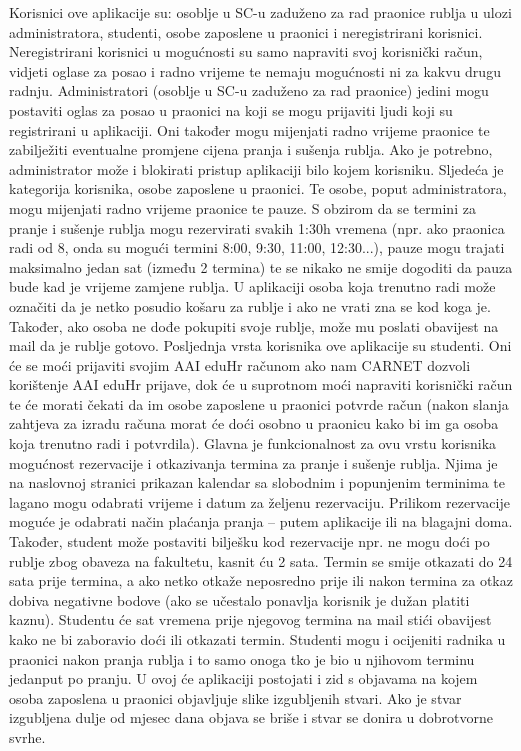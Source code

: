 			{Korisnici ove aplikacije su: osoblje u SC-u zaduženo za rad praonice rublja u ulozi administratora,
			studenti, osobe zaposlene u praonici i neregistrirani korisnici.
			Neregistrirani korisnici u mogućnosti su samo napraviti svoj korisnički račun, vidjeti oglase za posao i
			radno vrijeme te nemaju mogućnosti ni za kakvu drugu radnju.
			Administratori (osoblje u SC-u zaduženo za rad praonice) jedini mogu postaviti oglas za posao u praonici
			na koji se mogu prijaviti ljudi koji su registrirani u aplikaciji. Oni također mogu mijenjati radno vrijeme
			praonice te zabilježiti eventualne promjene cijena pranja i sušenja rublja. Ako je potrebno,
			administrator može i blokirati pristup aplikaciji bilo kojem korisniku.
			Sljedeća je kategorija korisnika, osobe zaposlene u praonici. Te osobe, poput administratora, mogu
			mijenjati radno vrijeme praonice te pauze. S obzirom da se termini za pranje i sušenje rublja mogu
			rezervirati svakih 1:30h vremena (npr. ako praonica radi od 8, onda su mogući termini 8:00, 9:30, 11:00,
			12:30...), pauze mogu trajati maksimalno jedan sat (između 2 termina) te se nikako ne smije dogoditi da
			pauza bude kad je vrijeme zamjene rublja. U aplikaciji osoba koja trenutno radi može označiti da je netko
			posudio košaru za rublje i ako ne vrati zna se kod koga je. Također, ako osoba ne dođe pokupiti svoje rublje,
			može mu poslati obavijest na mail da je rublje gotovo.
			Posljednja vrsta korisnika ove aplikacije su studenti. Oni će se moći prijaviti svojim AAI eduHr računom
			ako nam CARNET dozvoli korištenje AAI eduHr prijave, dok će u suprotnom moći napraviti korisnički
			račun te će morati čekati da im osobe zaposlene u praonici potvrde račun (nakon slanja zahtjeva za
			izradu računa morat će doći osobno u praonicu kako bi im ga osoba koja trenutno radi i potvrdila).
			Glavna je funkcionalnost za ovu vrstu korisnika mogućnost rezervacije i otkazivanja termina za pranje i
			sušenje rublja. Njima je na naslovnoj stranici prikazan kalendar sa slobodnim i popunjenim terminima te
			lagano mogu odabrati vrijeme i datum za željenu rezervaciju. Prilikom rezervacije moguće je odabrati
			način plaćanja pranja – putem aplikacije ili na blagajni doma. Također, student može postaviti bilješku
			kod rezervacije npr. ne mogu doći po rublje zbog obaveza na fakultetu, kasnit ću 2 sata. Termin se smije
			otkazati do 24 sata prije termina, a ako netko otkaže neposredno prije ili nakon termina za otkaz dobiva
			negativne bodove (ako se učestalo ponavlja korisnik je dužan platiti kaznu). Studentu će sat vremena
			prije njegovog termina na mail stići obavijest kako ne bi zaboravio doći ili otkazati termin.
			Studenti mogu i ocijeniti radnika u praonici nakon pranja rublja i to samo onoga tko je bio u njihovom
			terminu jedanput po pranju.
			U ovoj će aplikaciji postojati i zid s objavama na kojem osoba zaposlena u praonici objavljuje slike
			izgubljenih stvari. Ako je stvar izgubljena dulje od mjesec dana objava se briše i stvar se donira u
			dobrotvorne svrhe. }
		
